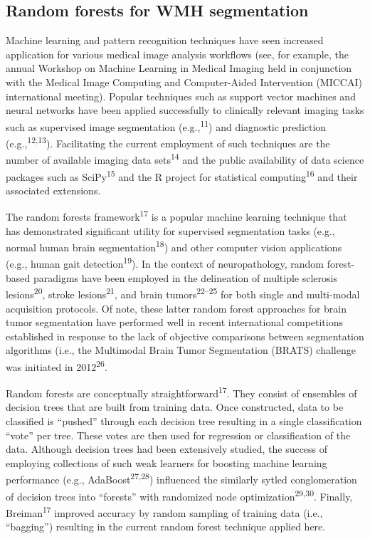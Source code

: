 \documentclass[11pt,]{article}
\begin{document}
\subsection{Random forests for WMH
segmentation}\label{random-forests-for-wmh-segmentation}

Machine learning and pattern recognition techniques have seen increased
application for various medical image analysis workflows (see, for
example, the annual Workshop on Machine Learning in Medical Imaging held
in conjunction with the Medical Image Computing and Computer-Aided
Intervention (MICCAI) international meeting). Popular techniques such as
support vector machines and neural networks have been applied
successfully to clinically relevant imaging tasks such as supervised
image segmentation (e.g.,\textsuperscript{11}) and diagnostic prediction
(e.g.,\textsuperscript{12,13}). Facilitating the current employment of
such techniques are the number of available imaging data
sets\textsuperscript{14} and the public availability of data science
packages such as SciPy\textsuperscript{15} and the R project for
statistical computing\textsuperscript{16} and their associated
extensions.

The random forests framework\textsuperscript{17} is a popular machine
learning technique that has demonstrated significant utility for
supervised segmentation tasks (e.g., normal human brain
segmentation\textsuperscript{18}) and other computer vision applications
(e.g., human gait detection\textsuperscript{19}). In the context of
neuropathology, random forest-based paradigms have been employed in the
delineation of multiple sclerosis lesions\textsuperscript{20}, stroke
lesions\textsuperscript{21}, and brain tumors\textsuperscript{22--25}
for both single and multi-modal acquisition protocols. Of note, these
latter random forest approaches for brain tumor segmentation have
performed well in recent international competitions established in
response to the lack of objective comparisons between segmentation
algorithms (i.e., the Multimodal Brain Tumor Segmentation (BRATS)
challenge was initiated in 2012\textsuperscript{26}.

Random forests are conceptually straightforward\textsuperscript{17}.
They consist of ensembles of decision trees that are built from training
data. Once constructed, data to be classified is ``pushed'' through each
decision tree resulting in a single classification ``vote'' per tree.
These votes are then used for regression or classification of the data.
Although decision trees had been extensively studied, the success of
employing collections of such weak learners for boosting machine
learning performance (e.g., AdaBoost\textsuperscript{27,28}) influenced
the similarly sytled conglomeration of decision trees into ``forests''
with randomized node optimization\textsuperscript{29,30}. Finally,
Breiman\textsuperscript{17} improved accuracy by random sampling of
training data (i.e., ``bagging'') resulting in the current random forest
technique applied here.
\end{document}
